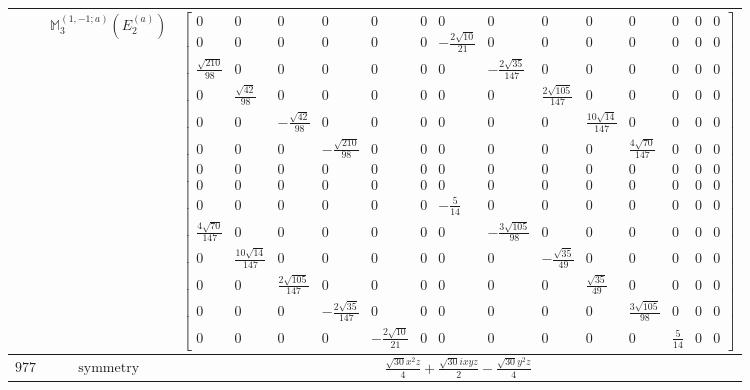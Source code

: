 \documentclass[fleqn,8pt,landscape]{jsarticle}
\begin{document}
\begin{longtable}{ccc}
$  $ & $ \mathbb{M}_{3}^{(1,-1;a)}(E_{2}^{(a)}) $ & $ \begin{bmatrix} 0 & 0 & 0 & 0 & 0 & 0 & 0 & 0 & 0 & 0 & 0 & 0 & 0 & 0 \\ 0 & 0 & 0 & 0 & 0 & 0 & - \frac{2 \sqrt{10}}{21} & 0 & 0 & 0 & 0 & 0 & 0 & 0 \\ \frac{\sqrt{210}}{98} & 0 & 0 & 0 & 0 & 0 & 0 & - \frac{2 \sqrt{35}}{147} & 0 & 0 & 0 & 0 & 0 & 0 \\ 0 & \frac{\sqrt{42}}{98} & 0 & 0 & 0 & 0 & 0 & 0 & \frac{2 \sqrt{105}}{147} & 0 & 0 & 0 & 0 & 0 \\ 0 & 0 & - \frac{\sqrt{42}}{98} & 0 & 0 & 0 & 0 & 0 & 0 & \frac{10 \sqrt{14}}{147} & 0 & 0 & 0 & 0 \\ 0 & 0 & 0 & - \frac{\sqrt{210}}{98} & 0 & 0 & 0 & 0 & 0 & 0 & \frac{4 \sqrt{70}}{147} & 0 & 0 & 0 \\ 0 & 0 & 0 & 0 & 0 & 0 & 0 & 0 & 0 & 0 & 0 & 0 & 0 & 0 \\ 0 & 0 & 0 & 0 & 0 & 0 & 0 & 0 & 0 & 0 & 0 & 0 & 0 & 0 \\ 0 & 0 & 0 & 0 & 0 & 0 & - \frac{5}{14} & 0 & 0 & 0 & 0 & 0 & 0 & 0 \\ \frac{4 \sqrt{70}}{147} & 0 & 0 & 0 & 0 & 0 & 0 & - \frac{3 \sqrt{105}}{98} & 0 & 0 & 0 & 0 & 0 & 0 \\ 0 & \frac{10 \sqrt{14}}{147} & 0 & 0 & 0 & 0 & 0 & 0 & - \frac{\sqrt{35}}{49} & 0 & 0 & 0 & 0 & 0 \\ 0 & 0 & \frac{2 \sqrt{105}}{147} & 0 & 0 & 0 & 0 & 0 & 0 & \frac{\sqrt{35}}{49} & 0 & 0 & 0 & 0 \\ 0 & 0 & 0 & - \frac{2 \sqrt{35}}{147} & 0 & 0 & 0 & 0 & 0 & 0 & \frac{3 \sqrt{105}}{98} & 0 & 0 & 0 \\ 0 & 0 & 0 & 0 & - \frac{2 \sqrt{10}}{21} & 0 & 0 & 0 & 0 & 0 & 0 & \frac{5}{14} & 0 & 0 \end{bmatrix} $ \\ \hline
$ 977 $ & $ \text{symmetry} $ & $ \frac{\sqrt{30} x^{2} z}{4} + \frac{\sqrt{30} i x y z}{2} - \frac{\sqrt{30} y^{2} z}{4} $ \\

\end{longtable}
\end{document}
